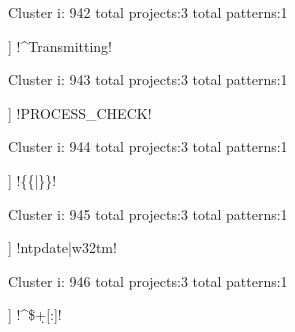 Cluster i: 942
total projects:3
total patterns:1
\begin{multicols}{1}
\begin{description}[noitemsep,topsep=0pt]
\item [[3] ] \cverb!^Transmitting!
\end{description}
\end{multicols}







Cluster i: 943
total projects:3
total patterns:1
\begin{multicols}{1}
\begin{description}[noitemsep,topsep=0pt]
\item [[3] ] \cverb!PROCESS_CHECK!
\end{description}
\end{multicols}







Cluster i: 944
total projects:3
total patterns:1
\begin{multicols}{1}
\begin{description}[noitemsep,topsep=0pt]
\item [[3] ] \cverb!\{\{|\}\}!
\end{description}
\end{multicols}







Cluster i: 945
total projects:3
total patterns:1
\begin{multicols}{1}
\begin{description}[noitemsep,topsep=0pt]
\item [[3] ] \cverb!ntpdate|w32tm!
\end{description}
\end{multicols}







Cluster i: 946
total projects:3
total patterns:1
\begin{multicols}{1}
\begin{description}[noitemsep,topsep=0pt]
\item [[3] ] \cverb!^\${\d+[:}]!
\end{description}
\end{multicols}








